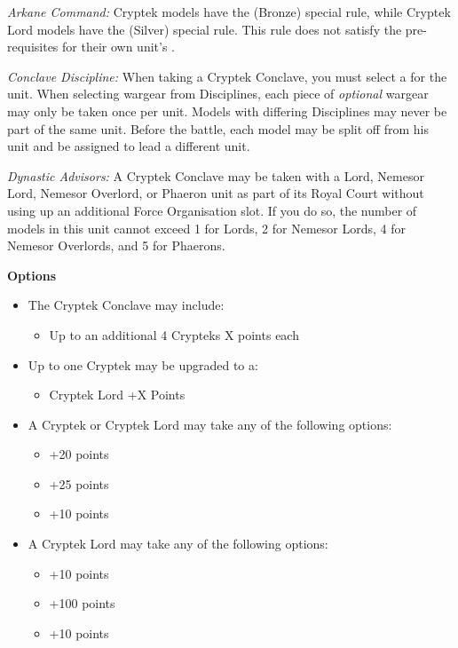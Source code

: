 \begin{minipage}[t]{0.72\textwidth}
	\textit{Arkane Command:} Cryptek models have the  (Bronze) special rule, while Cryptek Lord models have the  (Silver) special rule. This rule does not satisfy the pre-requisites for their own unit's .
	
	\textit{Conclave Discipline:} When taking a Cryptek Conclave, you must select a  for the unit. When selecting wargear from Disciplines, each piece of \textit{optional} wargear may only be taken once per unit. Models with differing Disciplines may never be part of the same unit. Before the battle, each model may be split off from his unit and be assigned to lead a different unit.
	
	\textit{Dynastic Advisors:} A Cryptek Conclave may be taken with a Lord, Nemesor Lord, Nemesor Overlord, or Phaeron unit as part of its Royal Court without using up an additional Force Organisation slot. If you do so, the number of models in this unit cannot exceed 1 for Lords, 2 for Nemesor Lords, 4 for Nemesor Overlords, and 5 for Phaerons.
	
	\vspace*{2em}
	\textbf{Options}
	\begin{itemize}
		\item The Cryptek Conclave may include:
		\begin{itemize}
			\item Up to an additional 4 Crypteks \dotfill X points each
		\end{itemize}
		\item Up to one Cryptek may be upgraded to a:
		\begin{itemize}
			\item Cryptek Lord \dotfill +X Points
		\end{itemize}
		\item A Cryptek or Cryptek Lord may take any of the following options:
		\begin{itemize}
			\item {} \dotfill +20 points
			\item {} \dotfill +25 points
			\item {} \dotfill +10 points
		\end{itemize}
		\item A Cryptek Lord may take any of the following options:
		\begin{itemize}
			\item {} \dotfill +10 points
			\item {} \dotfill +100 points
			\item {} \dotfill +10 points
		\end{itemize}
	\end{itemize}
\end{minipage}
